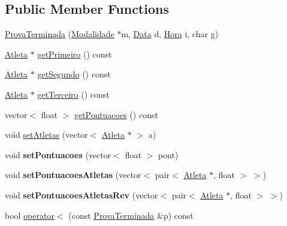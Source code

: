 \subsection*{Public Member Functions}
\begin{DoxyCompactItemize}
\item 
\hyperlink{class_prova_terminada_a273ba377768056d52dc71770d91c860c}{Prova\+Terminada} (\hyperlink{class_modalidade}{Modalidade} $\ast$m, \hyperlink{class_data}{Data} d, \hyperlink{class_hora}{Hora} i, char g)
\item 
\hyperlink{class_atleta}{Atleta} $\ast$ \hyperlink{class_prova_terminada_aa66bb50f4a969d6a4795bb39595705d8}{get\+Primeiro} () const 
\item 
\hyperlink{class_atleta}{Atleta} $\ast$ \hyperlink{class_prova_terminada_a3117799dd3ddb513442376203f0ea035}{get\+Segundo} () const 
\item 
\hyperlink{class_atleta}{Atleta} $\ast$ \hyperlink{class_prova_terminada_a332c8f4466c18f153a3ebf7347ab944a}{get\+Terceiro} () const 
\item 
vector$<$ float $>$ \hyperlink{class_prova_terminada_a449d07fa099785eda45301303792b6b0}{get\+Pontuacoes} () const 
\item 
void \hyperlink{class_prova_terminada_a189ef4830e8e6dbe3e50153bdc28b1ed}{set\+Atletas} (vector$<$ \hyperlink{class_atleta}{Atleta} $\ast$ $>$ a)
\item 
\hypertarget{class_prova_terminada_a8b02034c7190ad01ee7674d166595c97}{}void {\bfseries set\+Pontuacoes} (vector$<$ float $>$ pont)\label{class_prova_terminada_a8b02034c7190ad01ee7674d166595c97}

\item 
\hypertarget{class_prova_terminada_afcff2f98ae33bf903ee3bee4c2a47f37}{}void {\bfseries set\+Pontuacoes\+Atletas} (vector$<$ pair$<$ \hyperlink{class_atleta}{Atleta} $\ast$, float $>$ $>$)\label{class_prova_terminada_afcff2f98ae33bf903ee3bee4c2a47f37}

\item 
\hypertarget{class_prova_terminada_a9a5ce1362cea1c8aba698c1b7a71d2e2}{}void {\bfseries set\+Pontuacoes\+Atletas\+Rev} (vector$<$ pair$<$ \hyperlink{class_atleta}{Atleta} $\ast$, float $>$ $>$)\label{class_prova_terminada_a9a5ce1362cea1c8aba698c1b7a71d2e2}

\item 
bool \hyperlink{class_prova_terminada_afe024233747b571f92080b6fc325b6a5}{operator$<$} (const \hyperlink{class_prova_terminada}{Prova\+Terminada} \&p) const 
\end{DoxyCompactItemize}
